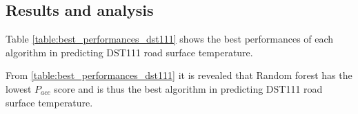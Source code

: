 	\subsection{Results and analysis}
	Table \ref{table:best_performances_dst111} shows the best performances of each algorithm in predicting DST111 road surface temperature. 


	\begin{table}[H]
		\centering
		\caption{Shows the overall optimal settings and performances for each of the algorithms in predicting precipitation amount.}
	\end{table}

		From \ref{table:best_performances_dst111} it is revealed that Random forest has the lowest $P_{acc}$ score and is thus the best algorithm in predicting DST111 road surface temperature.



